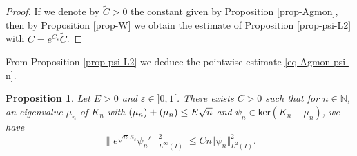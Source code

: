 \documentclass[10pt]{amsart}
\theoremstyle{plain}
\newtheorem{proposition}[theorem]{Proposition}
\theoremstyle{definition}
\newcommand{\nr}[1]{\Vert #1\Vert}
\newcommand{\1}{\mathds 1}
\let\Re\relax
\DeclareMathOperator{\Re}{\mathsf{Re}\mkern2mu}
\let\Im\relax
\DeclareMathOperator{\Im}{\mathsf{Im}\mkern2mu}
\renewcommand{\ker}{\mathsf{ker}}
\newcommand{\N}{\mathbb{N}}
\let\e\varepsilon
\let\m\mu
\begin{document}
\begin{proof}
If we denote by $\tilde C > 0$ the constant given by Proposition \ref{prop-Agmon}, then by Proposition \ref{prop-W} we obtain the estimate of Proposition \ref{prop-psi-L2} with $C = e^{C_\e} \tilde C$.
\end{proof}

From Proposition \ref{prop-psi-L2} we deduce the pointwise estimate \eqref{eq-Agmon-psi-n}.

\begin{proposition} \label{prop-psi-Linf}
Let $E > 0$ and $\e \in{}]0,1[$. There exists $C > 0$ such that for $n \in \N$, an eigenvalue $\m_n$ of $K_n$ with $\Re(\m_n) + \Im(\m_n) \leq E \sqrt n$ and $\psi_n \in \ker(K_n-\m_n)$, we have
\[
\big\|e^{\sqrt n\,\kappa_\e} \psi_n'\big\|_{L^\infty(I)}^2 \leq C n \nr{\psi_n}_{L^2(I)}^2.
\]
\end{proposition}
\end{document}

